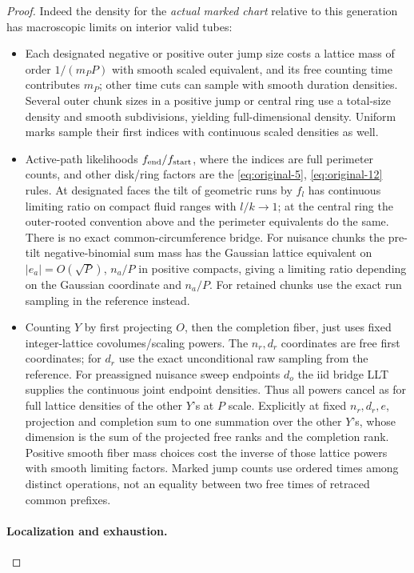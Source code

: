 \begin{proof}
Indeed the density for the \emph{actual marked chart} relative to this generation has macroscopic limits on
interior valid tubes:
\begin{itemize}
\item Each designated negative or positive outer jump size costs a lattice mass of order \(1/(m_P P)\) with smooth scaled equivalent, and its free counting time contributes \(m_P\); other time cuts can sample with smooth duration densities. Several outer chunk sizes in a positive jump or central ring use a total-size density and smooth subdivisions, yielding full-dimensional density. Uniform marks sample their first indices with continuous scaled densities as well.
\item Active-path likelihoods \(f_{\rm end}/f_{\rm start}\), where the indices are full perimeter counts, and other disk/ring factors are the \eqref{eq:original-5}, \eqref{eq:original-12} rules. At designated faces the tilt of geometric runs by \(f_l\) has continuous limiting ratio on compact fluid ranges with \(l/k\to 1\); at the central ring the outer-rooted convention above and the perimeter equivalents do the same. There is no exact common-circumference bridge. For nuisance chunks the pre-tilt negative-binomial sum mass has the Gaussian lattice equivalent on \(|e_a|=O(\sqrt P)\), \(n_a/P\) in positive compacts, giving a limiting ratio depending on the Gaussian coordinate and \(n_a/P\). For retained chunks use the exact run sampling in the reference instead.
\item Counting \(Y\) by first projecting \(O\), then the completion fiber, just uses fixed integer-lattice covolumes/scaling powers. The \(n_r,d_r\) coordinates are free first coordinates; for \(d_r\) use the exact unconditional raw sampling from the reference. For preassigned nuisance sweep endpoints \(d_o\) the iid bridge LLT supplies the continuous joint endpoint densities. Thus all powers cancel as for full lattice densities of the other \(Y\)'s at \(P\) scale. Explicitly at fixed \(n_r,d_r,e\), projection and completion sum to one summation over the other \(Y\)'s, whose dimension is the sum of the projected free ranks and the completion rank. Positive smooth fiber mass choices cost the inverse of those lattice powers with smooth limiting factors. Marked jump counts use ordered times among distinct operations, not an equality between two free times of retraced common prefixes.
\end{itemize}

\paragraph{Localization and exhaustion.}


\end{proof}
